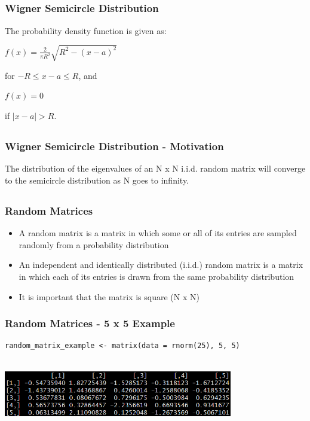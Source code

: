 \documentclass[handout, xcolor=dvipsnames]{beamer}
\begin{document}
\subsection{}
\begin{frame}
	\frametitle{Wigner Semicircle Distribution}
        The probability density function is given as:
        \begin{center}
            $f(x)=\frac{2}{\pi R^2}\sqrt{R^2-(x-a)^2}$
        \end{center}
        for $-R \leq x-a \leq R$, and
        \begin{center}
            $f(x)=0$ 
        \end{center}
        if $|x-a|>R$.
\end{frame}


\subsection{}
\begin{frame}
	\frametitle{Wigner Semicircle Distribution - Motivation}
        \begin{center}
            The distribution of the eigenvalues of an N x N i.i.d. random matrix will converge to the semicircle distribution as N goes to infinity.
        \end{center}
\end{frame}


\subsection{}
\begin{frame}
	\frametitle{Random Matrices}
        \begin{itemize}
            \item A random matrix is a matrix in which some or all of its entries are sampled randomly from a probability distribution
            \item An independent and identically distributed (i.i.d.) random matrix is a matrix in which each of its entries is drawn from the same probability distribution
            \item It is important that the matrix is square (N x N)
        \end{itemize}
\end{frame}

    
\begin{frame}[fragile]
  \frametitle{Random Matrices - 5 x 5 Example}
  \begin{lstlisting}
random_matrix_example <- matrix(data = rnorm(25), 5, 5)
  \end{lstlisting}
  \begin{center}
      \includegraphics[width=10cm,height=3cm]{Figures/random_matrix_example.png}
  \end{center}
\end{frame}
\end{document}
